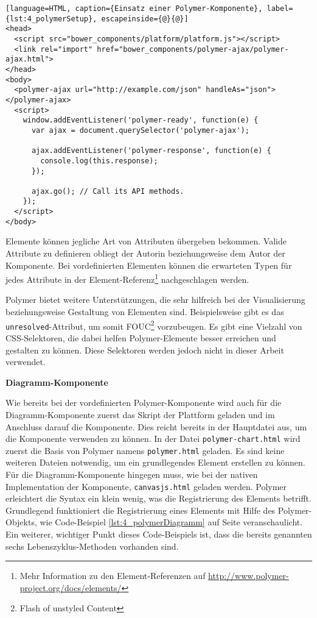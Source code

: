 \begin{lstlisting}[language=HTML, caption={Einsatz einer Polymer-Komponente}, label={lst:4_polymerSetup}, escapeinside={@}{@}]
<head>
  <script src="bower_components/platform/platform.js"></script>
  <link rel="import" href="bower_components/polymer-ajax/polymer-ajax.html">
</head>
<body>
  <polymer-ajax url="http://example.com/json" handleAs="json"></polymer-ajax>
  <script>
    window.addEventListener('polymer-ready', function(e) {
      var ajax = document.querySelector('polymer-ajax');

      ajax.addEventListener('polymer-response', function(e) {
        console.log(this.response);
      });

      ajax.go(); // Call its API methods.
    });
  </script>
</body>
\end{lstlisting}

Elemente können jegliche Art von Attributen übergeben bekommen. Valide Attribute zu definieren obliegt der Autorin beziehungsweise dem Autor der Komponente. Bei vordefinierten Elementen können die erwarteten Typen für jedes Attribute in der Element-Referenz\footnote{Mehr Information zu den Element-Referenzen auf \url{http://www.polymer-project.org/docs/elements/}} nachgeschlagen werden.

Polymer bietet weitere Unterstützungen, die sehr hilfreich bei der Visualisierung beziehungsweise Gestaltung von Elementen sind. Beispielsweise gibt es das \lstinline|unresolved|-Attribut, um somit \glqq FOUC\grqq \footnote{Flash of unstyled Content} vorzubeugen. Es gibt eine Vielzahl von CSS-Selektoren, die dabei helfen Polymer-Elemente besser erreichen und gestalten zu können. Diese Selektoren werden jedoch nicht in dieser Arbeit verwendet.

\textbf{Diagramm-Komponente}

Wie bereits bei der vordefinierten Polymer-Komponente wird auch für die Diagramm-Komponente zuerst das Skript der Plattform geladen und im Anschluss darauf die Komponente. Dies reicht bereits in der Hauptdatei aus, um die Komponente verwenden zu können. In der Datei \lstinline|polymer-chart.html| wird zuerst die Basis von Polymer namens \lstinline|polymer.html| geladen. Es sind keine weiteren Dateien notwendig, um ein grundlegendes Element erstellen zu können. Für die Diagramm-Komponente hingegen muss, wie bei der nativen Implementation der Komponente, \lstinline|canvasjs.html| geladen werden. Polymer erleichtert die Syntax ein klein wenig, was die Registrierung des Elements betrifft. Grundlegend funktioniert die Registrierung eines Elements mit Hilfe des Polymer-Objekts, wie Code-Beispiel \ref{lst:4_polymerDiagramm} auf Seite \pageref{lst:4_polymerDiagramm} veranschaulicht. Ein weiterer, wichtiger Punkt dieses Code-Beispiels ist, dass die bereits genannten sechs Lebenszyklus-Methoden vorhanden sind.

